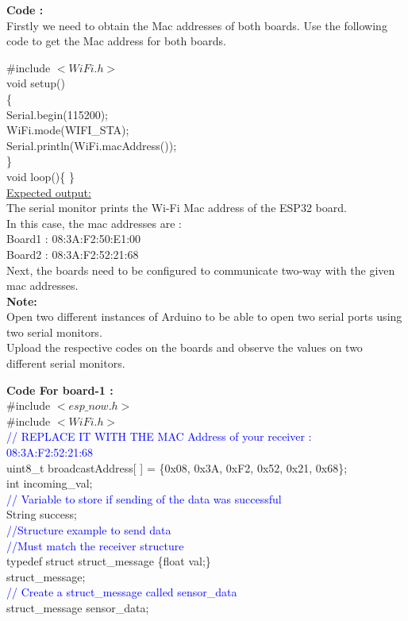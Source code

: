 \documentclass[12pt,a4paper]{article}
\begin{document}
\textbf{\large Code :}\\[6pt]
Firstly we need to obtain the Mac addresses of both boards. Use the following code to get the Mac address for both boards.

\#include $<WiFi.h>$\\
void setup()\\
\{\\
  Serial.begin(115200);\\
  WiFi.mode(WIFI\_STA);\\
  Serial.println(WiFi.macAddress());\\
\}\\
void loop()\{ \}\\[15pt]


\underline{Expected output:}\\
The serial monitor prints the Wi-Fi Mac address of the ESP32 board. \\
In this case, the mac addresses are :\\
Board1 : 08:3A:F2:50:E1:00\\
Board2 : 08:3A:F2:52:21:68\\
Next, the boards need to be configured to communicate two-way with the given mac addresses.\\
\textbf{Note:}\\
Open two different instances of Arduino to be able to open two serial ports using two serial monitors.\\
Upload the respective codes on the boards and observe the values on two different serial monitors.

\textbf{\large Code For board-1 :}\\[6pt]

\#include $<esp\_now.h>$\\
\#include $<WiFi.h>$\\

\textcolor{blue}{// REPLACE IT WITH THE MAC Address of your receiver 
:\\08:3A:F2:52:21:68}\\
uint8\_t broadcastAddress[ ] = \{0x08, 0x3A, 0xF2, 0x52, 0x21, 0x68\};\\
int incoming\_val;\\
\textcolor{blue}{// Variable to store if sending of the data was successful}\\
String success;\\
\textcolor{blue}{//Structure example to send data}\\
\textcolor{blue}{//Must match the receiver structure}\\
typedef struct struct\_message \{float val;\}\\
struct\_message;\\
\textcolor{blue}{// Create a struct\_message called sensor\_data }\\
struct\_message sensor\_data;\\
\end{document}
